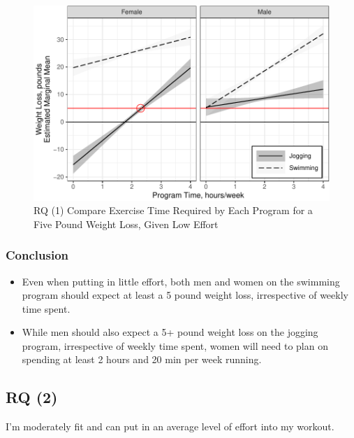 \documentclass[
]{article}
\begin{document}
\begin{figure}[hb]

\includegraphics{Appendix_ex_weightloss_files/figure-latex/unnamed-chunk-87-1} \hfill{}

\caption{RQ (1) Compare Exercise Time Required by Each Program for a Five Pound Weight Loss, Given Low Effort}\label{fig:unnamed-chunk-87}
\end{figure}

\clearpage

\hypertarget{conclusion}{%
\subsubsection{Conclusion}\label{conclusion}}

\begin{itemize}
\item
  Even when putting in little effort, both men and women on the swimming
  program should expect at least a 5 pound weight loss, irrespective of
  weekly time spent.
\item
  While men should also expect a 5+ pound weight loss on the jogging
  program, irrespective of weekly time spent, women will need to plan on
  spending at least 2 hours and 20 min per week running.
\end{itemize}

\clearpage

\hypertarget{rq-2-1}{%
\subsection{RQ (2)}\label{rq-2-1}}

I'm moderately fit and can put in an average level of effort into my
workout.
\end{document}
